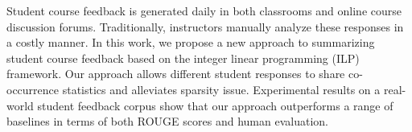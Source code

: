 Student course feedback is generated daily in both classrooms and online course discussion forums. Traditionally, instructors manually analyze these responses in a costly manner. In this work, we propose a new approach to summarizing student course feedback based on the integer linear programming (ILP) framework. Our approach allows different student responses to share co-occurrence statistics and alleviates sparsity issue. Experimental results on a real-world student feedback corpus show that our approach outperforms a range of baselines in terms of both ROUGE scores and human evaluation.
